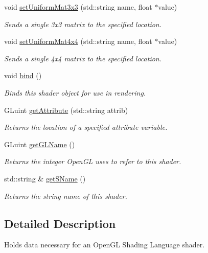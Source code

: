 \begin{DoxyCompactItemize}
void \hyperlink{class_shader_a5fc56e81d8c383de3ce2662466d1ea37}{set\-Uniform\-Mat3x3} (std\-::string name, float $\ast$value)
\begin{DoxyCompactList}\small\item\em Sends a single 3x3 matrix to the specified location. \end{DoxyCompactList}\item 
void \hyperlink{class_shader_a2737cc648540a20b1aae2bb9ee379b17}{set\-Uniform\-Mat4x4} (std\-::string name, float $\ast$value)
\begin{DoxyCompactList}\small\item\em Sends a single 4x4 matrix to the specified location. \end{DoxyCompactList}\item 
\hypertarget{class_shader_a6f6e280a343d6c7662909f7dfbc89ad9}{void \hyperlink{class_shader_a6f6e280a343d6c7662909f7dfbc89ad9}{bind} ()}\label{class_shader_a6f6e280a343d6c7662909f7dfbc89ad9}

\begin{DoxyCompactList}\small\item\em Binds this shader object for use in rendering. \end{DoxyCompactList}\item 
G\-Luint \hyperlink{class_shader_a7dd239254890247f4fea33562321d5a4}{get\-Attribute} (std\-::string attrib)
\begin{DoxyCompactList}\small\item\em Returns the location of a specified attribute variable. \end{DoxyCompactList}\item 
G\-Luint \hyperlink{class_shader_a4f02454610c65e719f06c3c62e2dafd6}{get\-G\-L\-Name} ()
\begin{DoxyCompactList}\small\item\em Returns the integer Open\-G\-L uses to refer to this shader. \end{DoxyCompactList}\item 
std\-::string \& \hyperlink{class_shader_a216d3749ecd7783aff7052c8c50eb65f}{get\-S\-Name} ()
\begin{DoxyCompactList}\small\item\em Returns the string name of this shader. \end{DoxyCompactList}\end{DoxyCompactItemize}


\subsection{Detailed Description}
Holds data necessary for an Open\-G\-L Shading Language shader. 

